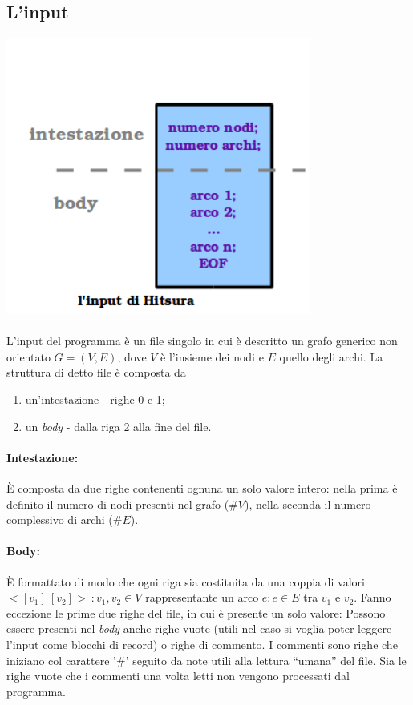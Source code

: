 \documentclass[a4paper,11pt]{report}
\begin{document}
\subsection{L'input}\label{L'input}
\centerline{\includegraphics[width=100mm]{images/hitsura-input.png}}
\paragraph{}\paragraph{}
L'input del programma è un file singolo in cui è descritto un grafo generico non orientato $G=\left(V,E\right)$, dove $V$ è l'insieme dei
nodi e $E$ quello degli archi. 
La struttura di detto file è composta da
\begin{enumerate}
 \item un'intestazione - righe 0 e 1;
 \item un \emph{body} - dalla riga 2 alla fine del file.
\end{enumerate}
\paragraph{Intestazione:} È composta da due righe contenenti ognuna un solo valore intero: nella prima è definito il numero di nodi presenti
nel grafo ($\# V$),
nella seconda il numero complessivo di archi ($\# E$).
\paragraph{Body:}È formattato di modo che ogni riga sia costituita da una coppia di valori
$<[v_1]\ [v_2]>\ : v_1,v_2\in V$ rappresentante un arco $e : e\in E$ tra $v_1$ e $v_2$. Fanno eccezione le prime due righe del file, in cui
è presente un solo valore:
Possono essere presenti nel \emph{body} anche righe vuote (utili nel caso si voglia poter leggere l'input come blocchi di record) o righe di
commento. I commenti sono righe che 
iniziano col carattere '$\#$' seguito da note utili alla lettura ``umana'' del file. Sia le righe vuote che i commenti una volta letti non
vengono processati dal programma.
\end{document}
